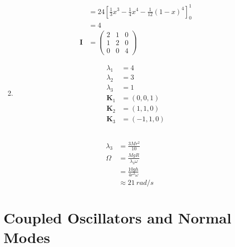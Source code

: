\documentclass{article}
\renewcommand{\vec}[1]{\boldsymbol{\mathbf{#1}}}
\begin{document}
\begin{enumerate}
\begin{align*}
                  & = 24 \left[ \frac{1}{3} x^3 - \frac{1}{4} x^4 - \frac{1}{12} (1 - x)^4 \right]_0^1 \\
                  & = 4                                                                                \\
          \vec{I} & = \begin{pmatrix}
                        2 & 1 & 0 \\
                        1 & 2 & 0 \\
                        0 & 0 & 4
                      \end{pmatrix}
        \end{align*}

  \item \begin{align*}
          \lambda_1 & = 4          \\
          \lambda_2 & = 3          \\
          \lambda_3 & = 1          \\
          \vec{K}_1 & = (0, 0, 1)  \\
          \vec{K}_2 & = (1, 1, 0)  \\
          \vec{K}_3 & = (-1, 1, 0)
        \end{align*}
\end{enumerate}

\setcounter{subsection}{38}
\subsection{}

\begin{align*}
  \lambda_3 & = \frac{3 M r^2}{10}             \\
  \Omega    & = \frac{M g R}{\lambda_3 \omega} \\
            & = \frac{10 g h}{4 r^2 \omega}    \\
            & \approx \qty{21}{rad/s}
\end{align*}

\section{Coupled Oscillators and Normal Modes}

\subsection{}
\end{document}

